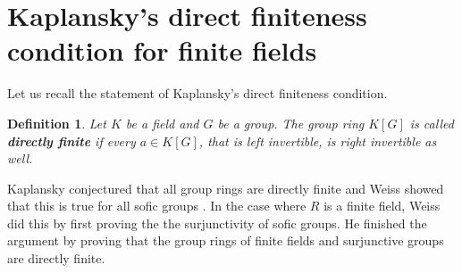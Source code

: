 \documentclass[titlepage, a4paper]{article}
\newtheorem{definition}{Definition}
\theoremstyle{remark}
\begin{document}
	\section{Kaplansky's direct finiteness condition for finite fields}
	Let us recall the statement of Kaplansky's direct finiteness condition.
	\begin{definition}
		Let $K$ be a field and $G$ be a group. The group ring $K[G]$ is called \textbf{directly finite} if every  $a \in K[G]$, that is left invertible, is right invertible as well. 
		
	\end{definition}
	Kaplansky conjectured that all group rings are directly finite and Weiss showed that this is true for all sofic groups \cite{weiss_2000}. 
	In the case where $R$ is a finite field, Weiss did this by first proving the the surjunctivity of sofic groups.
	He finished the argument by proving that the group rings of finite fields and surjunctive groups are directly finite.  
\end{document}
